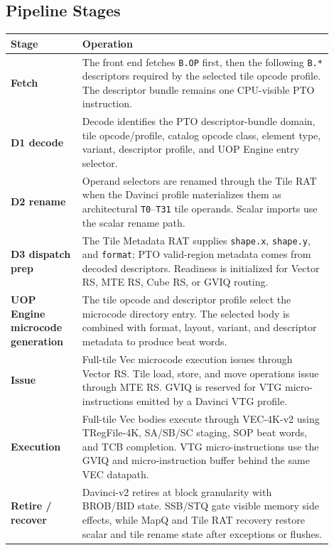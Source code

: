 \subsection{Pipeline Stages}
\begin{longtable}{@{}L{0.20\linewidth}L{0.70\linewidth}@{}}
\toprule
Stage & Operation \\
\midrule
\textbf{Fetch} & The front end fetches \texttt{B.OP} first, then the following \texttt{B.*} descriptors required by the selected tile opcode profile. The descriptor bundle remains one CPU-visible PTO instruction. \\
\textbf{D1 decode} & Decode identifies the PTO descriptor-bundle domain, tile opcode/profile, catalog opcode class, element type, variant, descriptor profile, and UOP Engine entry selector. \\
\textbf{D2 rename} & Operand selectors are renamed through the Tile RAT when the Davinci profile materializes them as architectural \texttt{T0}--\texttt{T31} tile operands. Scalar imports use the scalar rename path. \\
\textbf{D3 dispatch prep} & The Tile Metadata RAT supplies \texttt{shape.x}, \texttt{shape.y}, and \texttt{format}; PTO valid-region metadata comes from decoded descriptors. Readiness is initialized for Vector RS, MTE RS, Cube RS, or GVIQ routing. \\
\textbf{UOP Engine microcode generation} & The tile opcode and descriptor profile select the microcode directory entry. The selected body is combined with format, layout, variant, and descriptor metadata to produce beat words. \\
\textbf{Issue} & Full-tile Vec microcode execution issues through Vector RS. Tile load, store, and move operations issue through MTE RS. GVIQ is reserved for VTG micro-instructions emitted by a Davinci VTG profile. \\
\textbf{Execution} & Full-tile Vec bodies execute through VEC-4K-v2 using TRegFile-4K, SA/SB/SC staging, SOP beat words, and TCB completion. VTG micro-instructions use the GVIQ and micro-instruction buffer behind the same VEC datapath. \\
\textbf{Retire / recover} & Davinci-v2 retires at block granularity with BROB/BID state. SSB/STQ gate visible memory side effects, while MapQ and Tile RAT recovery restore scalar and tile rename state after exceptions or flushes. \\
\bottomrule
\end{longtable}

